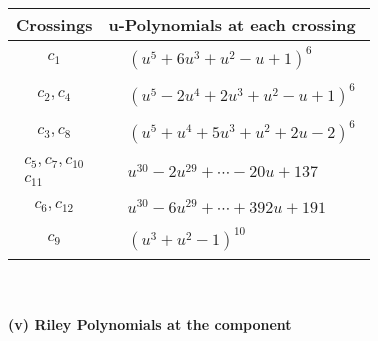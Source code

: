 \documentclass[1p]{elsarticle_modified}
\theoremstyle{definition}
\begin{document}
\begin{tabular}{m{50pt}|m{274pt}}
Crossings & \hspace{64pt}u-Polynomials at each crossing \\
\hline $$\begin{aligned}c_{1}\end{aligned}$$&$\begin{aligned}
&(u^5+6 u^3+u^2- u+1)^6
\end{aligned}$\\
\hline $$\begin{aligned}c_{2},c_{4}\end{aligned}$$&$\begin{aligned}
&(u^5-2 u^4+2 u^3+u^2- u+1)^6
\end{aligned}$\\
\hline $$\begin{aligned}c_{3},c_{8}\end{aligned}$$&$\begin{aligned}
&(u^5+u^4+5 u^3+u^2+2 u-2)^6
\end{aligned}$\\
\hline $$\begin{aligned}c_{5},c_{7},c_{10}\\c_{11}\end{aligned}$$&$\begin{aligned}
&u^{30}-2 u^{29}+\cdots-20 u+137
\end{aligned}$\\
\hline $$\begin{aligned}c_{6},c_{12}\end{aligned}$$&$\begin{aligned}
&u^{30}-6 u^{29}+\cdots+392 u+191
\end{aligned}$\\
\hline $$\begin{aligned}c_{9}\end{aligned}$$&$\begin{aligned}
&(u^3+u^2-1)^{10}
\end{aligned}$\\
\hline
\end{tabular}\\~\\
\newpage\renewcommand{\arraystretch}{1}
\flushleft \textbf{(v) Riley Polynomials at the component}\newline \\
\end{document}
